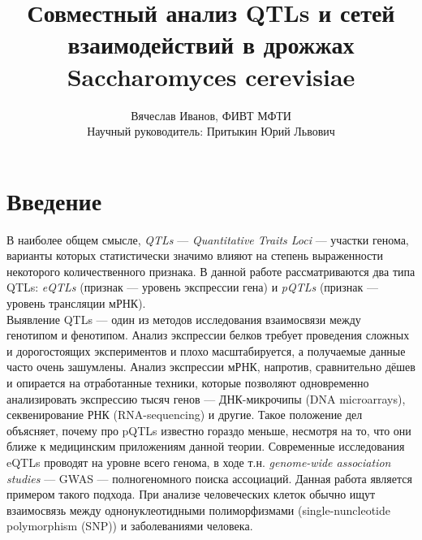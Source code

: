 \documentclass[11pt,a4paper]{report}
\title{Совместный анализ QTLs и сетей взаимодействий в дрожжах Saccharomyces cerevisiae}
\author{Вячеслав Иванов, ФИВТ МФТИ\\Научный руководитель: Притыкин Юрий Львович}
\theoremstyle{definition}
\theoremstyle{definition}
\theoremstyle{definition}
\begin{document}
	\setlength{\parindent}{1cm}
	{\let\newpage\relax\maketitle}
	\tableofcontents
	\graphicspath{ {/home/vvi/Science/eQTL_analysis/img/} } 
	\newpage
	\section{Введение}
	В наиболее общем смысле, \textit{QTLs} — \textit{Quantitative Traits Loci} — участки генома, варианты которых статистически значимо влияют на степень выраженности некоторого количественного признака. В данной работе рассматриваются два типа QTLs: \textit{eQTLs} (признак — уровень экспрессии гена) и \textit{pQTLs} (признак — уровень трансляции мРНК).\\
	
	Выявление QTLs  — один из методов исследования взаимосвязи между генотипом и фенотипом. Анализ экспрессии белков требует проведения сложных и дорогостоящих экспериментов и плохо масштабируется, а получаемые данные часто очень зашумлены. Анализ экспрессии мРНК, напротив, сравнительно дёшев и опирается на отработанные техники, которые позволяют одновременно анализировать экспрессию тысяч генов — ДНК-микрочипы (DNA microarrays), секвенирование РНК (RNA-sequencing) и другие. Такое положение дел объясняет, почему про pQTLs известно гораздо меньше, несмотря на то, что они ближе к медицинским приложениям данной теории. Современные исследования eQTLs проводят на уровне всего генома, в ходе т.н. \textit{genome-wide association studies} — GWAS — полногеномного поиска ассоциаций. Данная работа является примером такого подхода. При анализе человеческих клеток обычно ищут взаимосвязь между однонуклеотидными полиморфизмами (single-nuncleotide polymorphism (SNP)) и заболеваниями человека.\\
	
\end{document}

